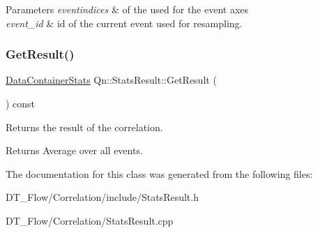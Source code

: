 \begin{DoxyParams}{Parameters}
{\em eventindices} & of the used for the event axes \\
\hline
{\em event\+\_\+id} & id of the current event used for resampling. \\
\hline
\end{DoxyParams}
\mbox{\label{classQn_1_1StatsResult_a6e47628edf1f85496c996cbd7ac884d5}} 
\subsubsection{\texorpdfstring{Get\+Result()}{GetResult()}}
{\footnotesize\ttfamily \mbox{\hyperlink{classQn_1_1DataContainer}{Data\+Container\+Stats}} Qn\+::\+Stats\+Result\+::\+Get\+Result (\begin{DoxyParamCaption}{ }\end{DoxyParamCaption}) const\hspace{0.3cm}{\ttfamily [inline]}}



Returns the result of the correlation. 

\begin{DoxyReturn}{Returns}
Average over all events. 
\end{DoxyReturn}


The documentation for this class was generated from the following files\+:\begin{DoxyCompactItemize}
\item 
D\+T\+\_\+\+Flow/\+Correlation/include/Stats\+Result.\+h\item 
D\+T\+\_\+\+Flow/\+Correlation/Stats\+Result.\+cpp\end{DoxyCompactItemize}
